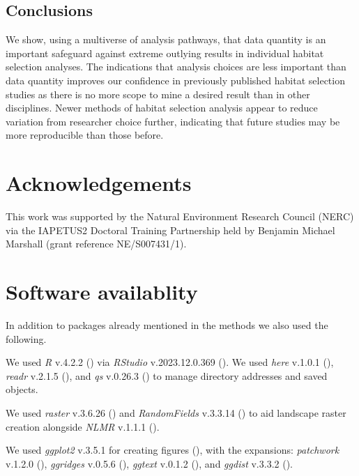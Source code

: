 \documentclass[10pt,a4paper]{article}
\begin{document}
\subsection{Conclusions}\label{conclusions}

We show, using a multiverse of analysis pathways, that data quantity is an important safeguard against extreme outlying results in individual habitat selection analyses.
The indications that analysis choices are less important than data quantity improves our confidence in previously published habitat selection studies as there is no more scope to mine a desired result than in other disciplines.
Newer methods of habitat selection analysis appear to reduce variation from researcher choice further, indicating that future studies may be more reproducible than those before.

\clearpage

\section{Acknowledgements}\label{acknowledgements}

This work was supported by the Natural Environment Research Council (NERC) via the IAPETUS2 Doctoral Training Partnership held by Benjamin Michael Marshall (grant reference NE/S007431/1).

\section{Software availablity}\label{software-availablity}

In addition to packages already mentioned in the methods we also used the following.

We used \emph{R} v.4.2.2 () via \emph{RStudio} v.2023.12.0.369 ().
We used \emph{here} v.1.0.1 (), \emph{readr} v.2.1.5 (), and \emph{qs} v.0.26.3 () to manage directory addresses and saved objects.

We used \emph{raster} v.3.6.26 () and \emph{RandomFields} v.3.3.14 () to aid landscape raster creation alongside \emph{NLMR} v.1.1.1 ().

We used \emph{ggplot2} v.3.5.1 for creating figures (), with the expansions: \emph{patchwork} v.1.2.0 (), \emph{ggridges} v.0.5.6 (), \emph{ggtext} v.0.1.2 (), and \emph{ggdist} v.3.3.2 ().
\end{document}
